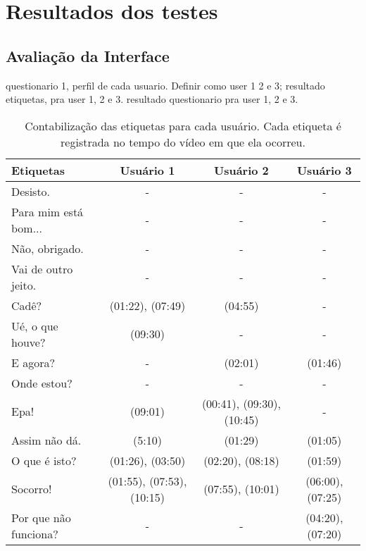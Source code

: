 \chapter{Resultados dos testes}


\section{Avaliação da Interface}

questionario 1, perfil de cada usuario. Definir como user 1 2 e 3;
resultado etiquetas, pra user 1, 2 e 3.
resultado questionario pra user 1, 2 e 3.

\begin{table}[h!]
  \centering
  \caption{Contabilização das etiquetas para cada usuário. Cada etiqueta é registrada no tempo do vídeo em que ela ocorreu.}
  \label{tabEtiquetas}
  \begin{tabular}{|l|c|c|c|}
  \hline
  {\cellcolor[HTML]{DFDFDF}Etiquetas} & {\cellcolor[HTML]{DFDFDF}Usuário 1} & {\cellcolor[HTML]{DFDFDF}Usuário 2} & {\cellcolor[HTML]{DFDFDF}Usuário 3} \\ \hline
  Desisto. & - & - & - \\ \hline
  Para mim está bom... & - & - & - \\ \hline
  Não, obrigado. & - & - & - \\ \hline
  Vai de outro jeito. & - & - & - \\ \hline
  Cadê? & (01:22), (07:49) & (04:55) & - \\ \hline
  Ué, o que houve? & (09:30) & - & - \\ \hline
  E agora? & - & (02:01) & (01:46) \\ \hline
  Onde estou? & - & - & - \\ \hline
  Epa! & (09:01) & (00:41), (09:30), (10:45) & - \\ \hline
  Assim não dá. & (5:10) & (01:29) & (01:05) \\ \hline
  O que é isto? & (01:26), (03:50) & (02:20), (08:18) & (01:59) \\ \hline
  Socorro! & (01:55), (07:53), (10:15) & (07:55), (10:01) & (06:00), (07:25) \\ \hline
  Por que não funciona? & - & - & (04:20), (07:20) \\ \hline
  \end{tabular}
\end{table}

